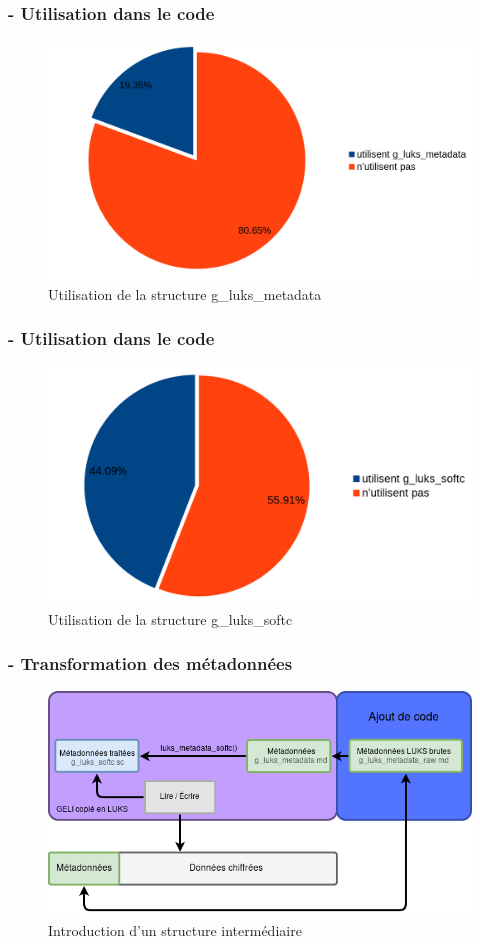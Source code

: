 \begin{frame}
	\frametitle{\insertsubsectionhead{} - Utilisation dans le code}
	\begin{figure}
		\includegraphics[width=.8\textwidth]{developpement/fonctions_g_luks_metadata}
		\caption{Utilisation de la structure g\_luks\_metadata}
	\end{figure}
\end{frame}
\begin{frame}
	\frametitle{\insertsubsectionhead{} - Utilisation dans le code}
	\begin{figure}
		\includegraphics[width=.8\textwidth]{developpement/fonctions_g_luks_softc}
		\caption{Utilisation de la structure g\_luks\_softc}
	\end{figure}
\end{frame}

\begin{frame}
	\frametitle{\insertsubsectionhead{} - Transformation des métadonnées}
	\begin{figure}
		\includegraphics[width=\textwidth]{developpement/utilisation_metadonnee_luks}
		\caption{Introduction d'un structure intermédiaire}
	\end{figure}
\end{frame}

